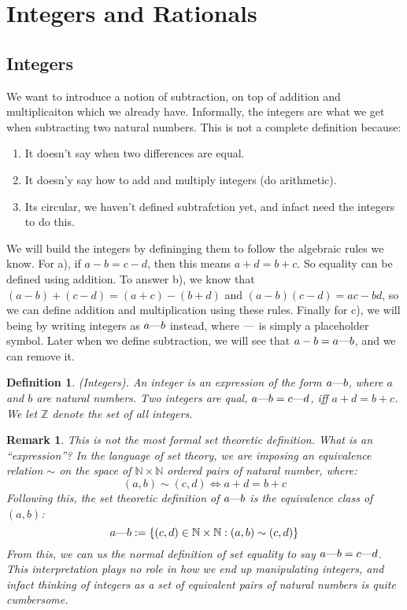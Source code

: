 \documentclass{article}
\newtheorem{definition}{Definition}[subsection]
\newtheorem{remark}{Remark}[subsection]
\newcommand{\Z}{\mathbb{Z}}
\newcommand{\N}{\mathbb{N}}
\newcommand{\mem}{\text{\textemdash}} %
\begin{document}
\newpage


\section{Integers and Rationals}

\subsection{Integers}

We want to introduce a notion of subtraction, on top of addition 
and multiplicaiton which we already have. Informally, the 
integers are what we get when subtracting two natural numbers.
This is not a complete definition because: 
\begin{enumerate}[label=\arabic*)]
	\item It doesn't say when two differences are equal.
	\item It doesn'y say how to add and multiply integers 
		(do arithmetic).
	\item Its circular, we haven't defined subtrafction yet, 
		and infact need the integers to do this.
\end{enumerate}
We will build the integers by defininging them to follow the algebraic
rules we know. For a), if $a-b = c-d$, then this means $a + d = b + c$.
So equality can be defined using addition. To answer b), we know 
that $(a - b) + (c -d) = (a + c) - (b + d)$ and $(a - b)(c - d) = ac - bd$,
so we can define addition and multiplication using these rules. 
Finally for c), we will being by writing integers as $a\mem b$ instead,
where $\mem$ is simply a placeholder symbol. Later when we define 
subtraction, we will see that $a-b = a\mem b$, and we can remove it. 

\begin{definition}
	(Integers). An integer is an expression of the form 
	$a\mem b$, where $a$ and $b$ are natural numbers. Two 
	integers are qual, $a\mem b = c\mem d$, iff $a + d = b + c$.
	We let $\Z$ denote the set of all integers.
\end{definition}

\begin{remark}
	This is not the most formal set theoretic definition. What 
	is an ``expression''? In the language of set theory, we 
	are imposing an equivalence relation $\sim$ on the space
	of $\N \times \N$ ordered pairs of natural number,
	where:
	$$
	(a,b) \sim (c,d) \iff a + d = b + c
	$$
	Following this, the set theoretic definition of $a \mem b$ is 
	the equivalence class of $(a,b)$:
	$$
	a \mem b := \{ (c,d) \in \N\times\N : (a,b) \sim (c,d) \}
	$$
	From this, we can us the normal definition of set equality
	to say $a \mem b = c \mem d$. 
	This interpretation plays no role in how we end up manipulating 
	integers, and infact thinking of integers as a set of 
	equivalent pairs of natural numbers is quite cumbersome.
\end{remark}
\end{document}

